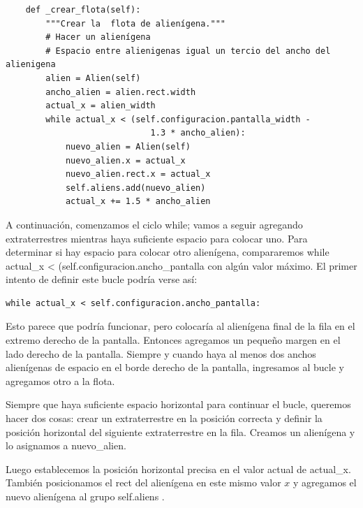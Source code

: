 \vspace{-0.2cm}
\hspace{-2.1cm}{\ttfamily \scriptsize \_alien.py}\vspace{-0.84cm}
\begin{lstlisting}
    def _crear_flota(self):
        """Crear la  flota de alienígena."""
        # Hacer un alienígena
        # Espacio entre alienigenas igual un tercio del ancho del alienigena
        alien = Alien(self)
        ancho_alien = alien.rect.width
        actual_x = alien_width
        while actual_x < (self.configuracion.pantalla_width - 
                             1.3 * ancho_alien):       
            nuevo_alien = Alien(self)
            nuevo_alien.x = actual_x
            nuevo_alien.rect.x = actual_x
            self.aliens.add(nuevo_alien)
            actual_x += 1.5 * ancho_alien
\end{lstlisting}



A continuación, comenzamos el ciclo while; vamos a seguir agregando extraterrestres
mientras haya suficiente espacio para colocar uno. Para determinar si hay espacio
para colocar otro alienígena, compararemos {\ttfamily  while actual\_x < (self.configuracion.ancho\_pantalla} con algún valor máximo.  El primer intento de definir este bucle podría verse así:

\begin{lstlisting}	
while actual_x < self.configuracion.ancho_pantalla:	
\end{lstlisting}


Esto parece que podría funcionar, pero colocaría al alienígena final de la fila en el extremo derecho de la pantalla.
Entonces agregamos un pequeño margen en el lado derecho de la pantalla. Siempre y cuando haya al menos dos anchos alienígenas
de espacio en el borde derecho de la pantalla, ingresamos al bucle y agregamos otro  a la flota.





Siempre que haya suficiente espacio horizontal para continuar el bucle, queremos hacer dos cosas: crear un extraterrestre en la posición correcta y definir la posición horizontal del siguiente extraterrestre en la fila. Creamos un alienígena y lo asignamos a {\ttfamily nuevo\_alien}. 

Luego establecemos la posición horizontal precisa en el valor actual de {\ttfamily actual\_x}. También posicionamos el {\ttfamily rect} del alienígena en este mismo valor $x$ y agregamos el nuevo alienígena al grupo  {\ttfamily self.aliens} .

